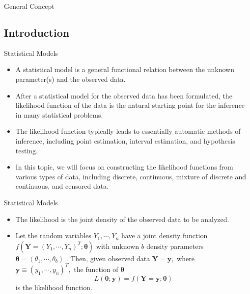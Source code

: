 \documentclass{beamer}
\begin{document}
\begin{section}{General Concept}                   %
    \subsection{Introduction}              %
    \begin{frame}{Statistical Models}
        \begin{itemize}
            \item A statistical model is a general functional relation between the unknown parameter(s) and
the observed data.
            \item After a statistical model for the observed data has been formulated, the likelihood function of the data is the natural starting point for the inference in many statistical problems.
            \item The likelihood function typically leads to essentially automatic methods of inference, including point estimation, interval estimation, and hypothesis testing.
            \item In this topic, we will focus on constructing the likelihood functions from various types of data, including discrete, continuous, mixture of discrete and continuous, and censored data.
        \end{itemize}
    \end{frame}

    \begin{frame}{Statistical Models}
        \begin{itemize}
            \item The likelihood is the joint density of the observed data to be analyzed.  \pause
            \item Let the random variables $Y_{1}, \cdots, Y_{n}$ have a joint density function  $f(\mathbf{Y} = (Y_{1}, \cdots, Y_{n})^{T}; \boldsymbol{\theta})$ with unknown  $b$ density parameters $\boldsymbol{\theta} = (\theta_{1}, \cdots, \theta_{b})$ . Then, given observed data $\mathbf{Y} = \mathbf{y},$ where $\mathbf{y} \equiv (y_{1}, \cdots, y_{n})^{T},$ the function of $\boldsymbol{\theta}$ 
$$L(\boldsymbol{\theta}; \mathbf{y}) = f(\mathbf{Y} = \mathbf{y};\boldsymbol{\theta})$$
is the likelihood function.
        \end{itemize}
    \end{frame}



\end{section}
\end{document}

